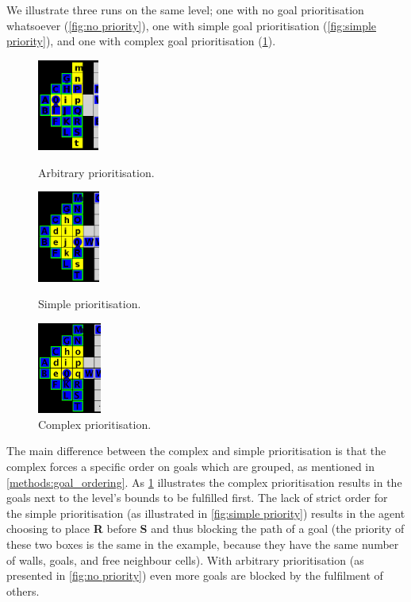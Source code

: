 We illustrate three runs on the same level;
one with no goal prioritisation whatsoever (\cref{fig:no priority}),
one with simple goal prioritisation (\cref{fig:simple priority}), and
one with complex goal prioritisation (\cref{fig:complex_priority}).

\begin{figure}[h!]
  \centering
  \begin{minipage}{.30\columnwidth}
    \centering
    \includegraphics[height=3cm]{graphics/no_priority_block.png}
    \caption{\label{fig:no priority}Arbi\-tra\-ry prioritisation.}
  \end{minipage}%
  \hspace{10pt}%
  \begin{minipage}{.30\columnwidth}
    \centering
    \includegraphics[height=3cm]{graphics/simple_priority_block.PNG}
    \caption{\label{fig:simple priority}Simple prioritisation.}
  \end{minipage}%
  \hspace{10pt}%
  \begin{minipage}{.30\columnwidth}
    \centering
    \includegraphics[height=3cm]{graphics/complex_priority.png}
    \caption{\label{fig:complex_priority}Comp\-lex prioritisation.}
  \end{minipage}
\end{figure}

The main difference between the complex and simple prioritisation is that the complex forces a specific order on goals which are grouped, as mentioned in \cref{methods:goal_ordering}.
As \cref{fig:complex_priority} illustrates the complex prioritisation results in the goals next to the level's bounds to be fulfilled first.
The lack of strict order for the simple prioritisation (as illustrated in \cref{fig:simple priority}) results in the agent choosing to place \textbf{R} before \textbf{S} and thus blocking the path of a goal (the priority of these two boxes is the same in the example, because they have the same number of walls, goals, and free neighbour cells).
With arbitrary prioritisation (as presented in \cref{fig:no priority}) even more goals are blocked by the fulfilment of others.

